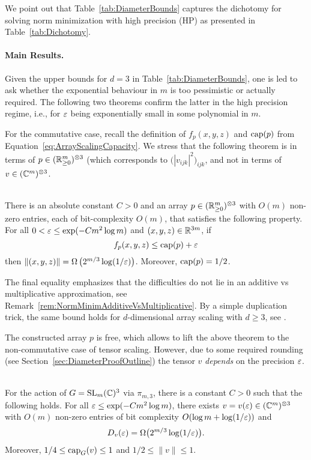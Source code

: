 We point out that Table~\ref{tab:DiameterBounds} captures the dichotomy for solving norm minimization with high precision (HP) as presented in Table~\ref{tab:Dichotomy}.


\paragraph{Main Results.}

Given the upper bounds for $d = 3$ in Table~\ref{tab:DiameterBounds}, one is led to ask whether the exponential behaviour in $m$ is too pessimistic or actually required. The following two theorems confirm the latter in the high precision regime, i.e., for $\varepsilon$ being exponentially small in some polynomial in $m$.

For the commutative case, recall the definition of $f_p(x,y,z)$ and $\operatorname{cap}(p)$ from Equation~\eqref{eq:ArrayScalingCapacity}. We stress that the following theorem is in terms of $p \in (\mathbb R_{\geq 0}^m)^{\otimes 3}$ (which corresponds to $\big( |v_{ijk}|^2 \big)_{ijk}$, and not in terms of $v \in (\mathbb C^m)^{\otimes 3}$.

\begin{theorem} \label{thm:diameterCommutative}  %
	\ \\
	There is an absolute constant $C > 0$ and an array $p \in (\mathbb R_{\geq 0}^m)^{\otimes 3}$ with $O(m)$ non-zero entries, each of bit-complexity $O(m)$, that satisfies the following property. For all $0 < \varepsilon \leq  \exp(- C m^2 \log m)$ and $(x,y,z) \in \mathbb R^{3m}$, if
		\[ f_p(x,y,z) \leq \operatorname{cap}(p) + \varepsilon \]
	then $\lVert(x,y,z)\rVert = \Omega\left(2^{m/3}\log(1/\varepsilon)\right)$. Moreover, $\operatorname{cap}(p) = 1/2$.
\end{theorem}

The final equality emphasizes that the difficulties do not lie in an additive vs multiplicative approximation, see Remark~\ref{rem:NormMinimAdditiveVsMultiplicative}. By a simple duplication trick, the same bound holds for $d$-dimensional array scaling with $d \geq 3$, see \cite[Corollary~3.7]{WeightMargin}.

The constructed array $p$ is free, which allows to lift the above theorem to the non-commutative case of tensor scaling. However, due to some required rounding (see Section~\ref{sec:DiameterProofOutline}) the tensor $v$ \emph{depends} on the precision $\varepsilon$.

\begin{theorem} \label{thm:nc-diameter}
	\ \\
	For the action of $G = \operatorname{SL}_m(\mathbb C)^3$ via $\pi_{m,3}$, there is a constant $C > 0$ such that the following holds. For all $\varepsilon \leq  \exp(- C m^2 \log m)$, there exists $v = v(\varepsilon) \in (\mathbb C^m)^{\otimes 3}$ with $O(m)$ non-zero entries of bit complexity $O(\log m + \log(1/\varepsilon))$ and
		\[ D_v(\varepsilon) = \Omega\big( 2^{m/3} \log(1/ \varepsilon) \big) . \]
	Moreover, $1/4 \leq \operatorname{cap}_G(v) \leq 1$ and $1/2 \leq \|v\| \leq 1$.
\end{theorem} 

